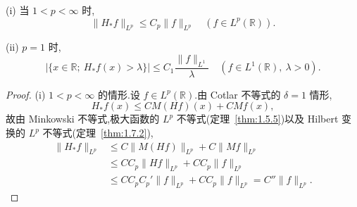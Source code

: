 
\begin{corollary}\label{cor:1.9.2}
(i) 当 $1 < p < \infty$ 时,
\begin{equation*}
\| H_{*}f \|_{L^{p}} \leq C_{p}\| f \|_{L^{p}} \quad (f \in L^{p}(\mathbb{R})).
\end{equation*}

(ii) $p = 1$ 时,
\begin{equation*}
|\{x \in \mathbb{R};\ H_{*}f(x) > \lambda\}| \leq C_{1}\frac{\| f \|_{L^{1}}}{\lambda} \quad (f \in L^{1}(\mathbb{R}),\ \lambda > 0).
\end{equation*}
\end{corollary}

\begin{proof}
(i) $1 < p < \infty$ 的情形.设 $f \in L^{p}(\mathbb{R})$.由 Cotlar 不等式的 $\delta = 1$ 情形,
\begin{equation*}
H_{*}f(x) \leq CM(Hf)(x) + CMf(x),
\end{equation*}
故由 Minkowski 不等式,极大函数的 $L^{p}$ 不等式(定理~\ref{thm:1.5.5})以及 Hilbert 变换的 $L^{p}$ 不等式(定理~\ref{thm:1.7.2}),
\begin{align*}
\| H_{*}f \|_{L^{p}} & \leq C\| M(Hf) \|_{L^{p}} + C\| Mf \|_{L^{p}} \\
& \leq CC_{p}\| Hf \|_{L^{p}} + CC_{p}\| f \|_{L^{p}} \\
& \leq CC_{p}C_{p}'\| f \|_{L^{p}} + CC_{p}\| f \|_{L^{p}} = C''\| f \|_{L^{p}}.
\end{align*}


\end{proof}
